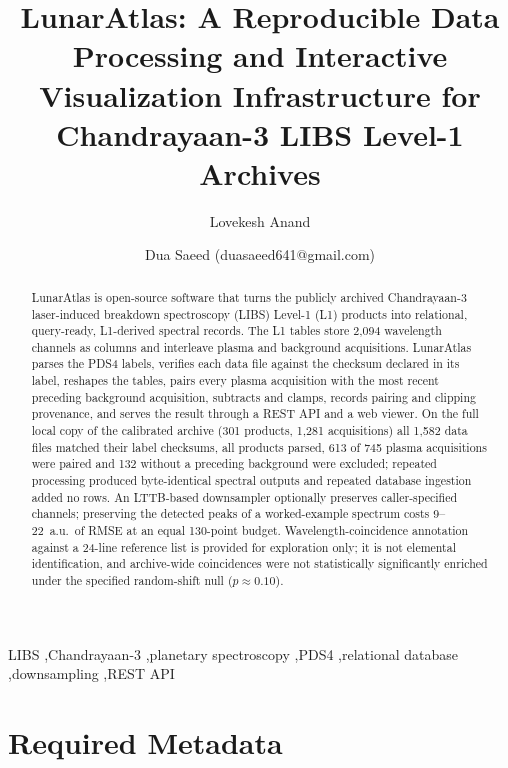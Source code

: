 \documentclass[final,5p,twocolumn,a4paper]{elsarticle}
\begin{document}
\begin{frontmatter}

\title{LunarAtlas: A Reproducible Data Processing and Interactive Visualization Infrastructure for Chandrayaan-3 LIBS Level-1 Archives}

\author[MDU]{Lovekesh Anand}
\author[MDU]{Dua Saeed (duasaeed641@gmail.com)}
\address[MDU]{Department of Computer Science and Engineering, Maharshi Dayanand University, Rohtak, Haryana, India}

\begin{abstract}
LunarAtlas is open-source software that turns the publicly archived Chandrayaan-3 laser-induced breakdown spectroscopy (LIBS) Level-1 (L1) products into relational, query-ready, L1-derived spectral records. The L1 tables store 2,094 wavelength channels as columns and interleave plasma and background acquisitions. LunarAtlas parses the PDS4 labels, verifies each data file against the checksum declared in its label, reshapes the tables, pairs every plasma acquisition with the most recent preceding background acquisition, subtracts and clamps, records pairing and clipping provenance, and serves the result through a REST API and a web viewer. On the full local copy of the calibrated archive (301 products, 1,281 acquisitions) all 1,582 data files matched their label checksums, all products parsed, 613 of 745 plasma acquisitions were paired and 132 without a preceding background were excluded; repeated processing produced byte-identical spectral outputs and repeated database ingestion added no rows. An LTTB-based downsampler optionally preserves caller-specified channels; preserving the detected peaks of a worked-example spectrum costs 9--22~a.u.\ of RMSE at an equal 130-point budget. Wavelength-coincidence annotation against a 24-line reference list is provided for exploration only; it is not elemental identification, and archive-wide coincidences were not statistically significantly enriched under the specified random-shift null ($p\approx0.10$).
\end{abstract}

\begin{keyword}
LIBS \sep Chandrayaan-3 \sep planetary spectroscopy \sep PDS4 \sep relational database \sep downsampling \sep REST API
\end{keyword}
\end{frontmatter}

\section*{Required Metadata}
\end{document}
